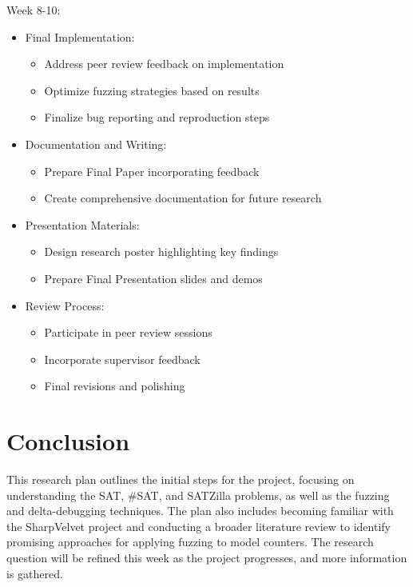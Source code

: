 \documentclass[english, a4paper]{article}
\begin{document}
Week 8-10:
\begin{itemize}
    \item Final Implementation:
    \begin{itemize}
        \item Address peer review feedback on implementation
        \item Optimize fuzzing strategies based on results
        \item Finalize bug reporting and reproduction steps
    \end{itemize}
    
    \item Documentation and Writing:
    \begin{itemize}
        \item Prepare Final Paper incorporating feedback
        \item Create comprehensive documentation for future research
    \end{itemize}
    
    \item Presentation Materials:
    \begin{itemize}
        \item Design research poster highlighting key findings
        \item Prepare Final Presentation slides and demos
    \end{itemize}
    
    \item Review Process:
    \begin{itemize}
        \item Participate in peer review sessions
        \item Incorporate supervisor feedback
        \item Final revisions and polishing
    \end{itemize}
\end{itemize}

\section*{Conclusion}

This research plan outlines the initial steps for the project, focusing on understanding the SAT, \#SAT, and SATZilla problems, as well as the fuzzing and delta-debugging techniques. The plan also includes becoming familiar with the SharpVelvet project and conducting a broader literature review to identify promising approaches for applying fuzzing to model counters. The research question will be refined this week as the project progresses, and more information is gathered.

\pagebreak

\printbibliography
\end{document}
